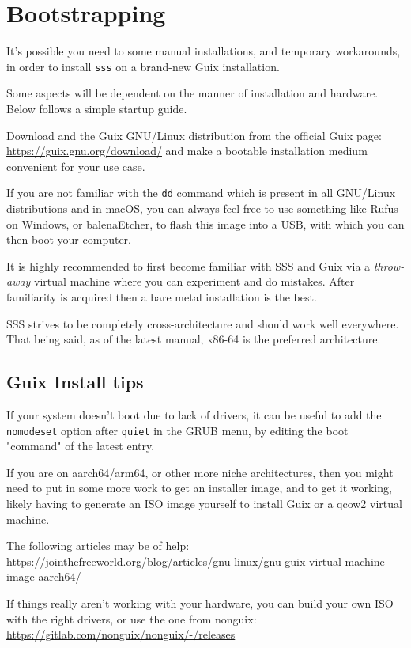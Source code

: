 \documentclass[11pt]{article}
\begin{document}
\section{Bootstrapping}
\label{sec:org2c7bbac}

It's possible you need to some manual installations, and temporary workarounds, in order to install \texttt{sss} on a brand-new Guix installation.

Some aspects will be dependent on the manner of installation and hardware. Below follows a simple startup guide.

Download and the Guix GNU/Linux distribution from the official Guix page: \url{https://guix.gnu.org/download/} and make a bootable installation medium convenient for your use case.

If you are not familiar with the \texttt{dd} command which is present in all GNU/Linux distributions and in macOS, you can always feel free to use something like Rufus on Windows, or balenaEtcher, to flash this image into a USB, with which you can then boot your computer.

It is highly recommended to first become familiar with SSS and Guix via a \emph{throw-away} virtual machine where you can experiment and do mistakes. After familiarity is acquired then a bare metal installation is the best.

SSS strives to be completely cross-architecture and should work well everywhere. That being said, as of the latest manual, x86-64 is the preferred architecture.

\subsection{Guix Install tips}
\label{sec:org07e89f9}

If your system doesn't boot due to lack of drivers, it can be useful to add the \texttt{nomodeset} option after \texttt{quiet} in the GRUB menu, by editing the boot "command" of the latest entry.

If you are on aarch64/arm64, or other more niche architectures, then you might need to put in some more work to get an installer image, and to get it working, likely having to generate an ISO image yourself to install Guix or a qcow2 virtual machine.

The following articles may be of help:
\url{https://jointhefreeworld.org/blog/articles/gnu-linux/gnu-guix-virtual-machine-image-aarch64/}

If things really aren't working with your hardware, you can build your own ISO with the right drivers, or use the one from nonguix: \url{https://gitlab.com/nonguix/nonguix/-/releases}
\end{document}
